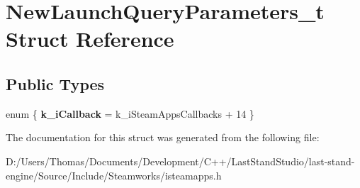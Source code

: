 \hypertarget{structNewLaunchQueryParameters__t}{}\section{New\+Launch\+Query\+Parameters\+\_\+t Struct Reference}
\label{structNewLaunchQueryParameters__t}
\subsection*{Public Types}
\begin{DoxyCompactItemize}
\item 
\hypertarget{structNewLaunchQueryParameters__t_a167471226dfea82bc225105a5d872794}{}enum \{ {\bfseries k\+\_\+i\+Callback} = k\+\_\+i\+Steam\+Apps\+Callbacks + 14
 \}\label{structNewLaunchQueryParameters__t_a167471226dfea82bc225105a5d872794}

\end{DoxyCompactItemize}


The documentation for this struct was generated from the following file\+:\begin{DoxyCompactItemize}
\item 
D\+:/\+Users/\+Thomas/\+Documents/\+Development/\+C++/\+Last\+Stand\+Studio/last-\/stand-\/engine/\+Source/\+Include/\+Steamworks/isteamapps.\+h\end{DoxyCompactItemize}
